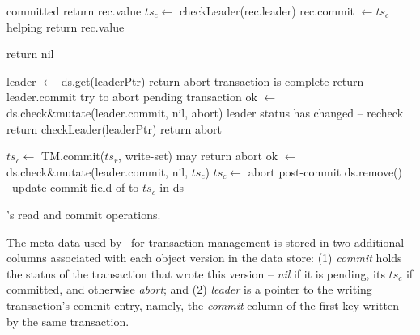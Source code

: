 \begin{algorithm}[t]
  \begin{algorithmic}
    \begin{small}
		 \Comment committed
     			   \State return rec.value \EndIf
 			\State $ts_c \leftarrow$ {\sc checkLeader}(rec.leader)
   			\State rec.commit $\leftarrow ts_c$ \Comment helping 
 			   \State return  rec.value \EndIf
      		\EndIf
      		


      \EndFor
      \State  return nil
      \EndProcedure

\Statex

      			\State leader $\leftarrow$ ds.get(leaderPtr)
     			  return abort \EndIf
		     	  \Comment transaction is complete
		     	 	\State return leader.commit 
		     	 \EndIf
		     	 \Comment try to abort pending transaction 
			\State ok $\leftarrow$ ds.check\&mutate(leader.commit, nil, abort)
			 \Comment leader status has changed -- recheck  
				\State return  {\sc checkLeader}({leaderPtr}) \EndIf
			\State return abort
	   	\EndProcedure

\Statex

      
      	\State $ts_c \leftarrow$ TM.commit($ts_r$, write-set) \Comment may return abort
	      	 \State  ok $\leftarrow$ ds.check\&mutate(leader.commit, nil,  $ts_c$)
   		 $ts_c \leftarrow$ abort \EndIf
	\EndIf
	\State \Comment post-commit
			 ds.remove()  	
			\Else\ update  commit field of  to $ts_c$  in ds%
			\EndIf
	\EndFor
\EndProcedure
      
       \end{small}
  \end{algorithmic}
  \caption{\sys's read and commit operations.} 
  \label{fig:get-pseudocode}
\end{algorithm} 

The meta-data used by \sys\ for transaction management is stored in two additional columns associated with each object version in the data store:
(1) \emph{commit} holds the status of the transaction that wrote this version -- \emph{nil} if it is pending, its  $ts_c$ if committed, and 
otherwise \emph{abort}; 
and
(2) \emph{leader} is a pointer to the writing transaction's commit entry, namely, the \emph{commit} column of the first key written by the same
transaction. 

